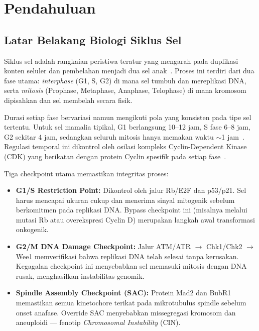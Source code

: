 \documentclass[conference]{IEEEtran}
\begin{document}
\section{Pendahuluan}

\subsection{Latar Belakang Biologi Siklus Sel}

Siklus sel adalah rangkaian peristiwa teratur yang mengarah pada duplikasi konten seluler dan pembelahan menjadi dua sel anak~\cite{alberts2022}. Proses ini terdiri dari dua fase utama: \textit{interphase} (G1, S, G2) di mana sel tumbuh dan mereplikasi DNA, serta \textit{mitosis} (Prophase, Metaphase, Anaphase, Telophase) di mana kromosom dipisahkan dan sel membelah secara fisik.

Durasi setiap fase bervariasi namun mengikuti pola yang konsisten pada tipe sel tertentu. Untuk sel mamalia tipikal, G1 berlangsung 10--12 jam, S fase 6--8 jam, G2 sekitar 4 jam, sedangkan seluruh mitosis hanya memakan waktu $\sim$1 jam~\cite{morgan2007}. Regulasi temporal ini dikontrol oleh osilasi kompleks Cyclin-Dependent Kinase (CDK) yang berikatan dengan protein Cyclin spesifik pada setiap fase~\cite{tyson2001}.

Tiga checkpoint utama memastikan integritas proses:
\begin{itemize}[noitemsep,topsep=3pt]
    \item \textbf{G1/S Restriction Point:} Dikontrol oleh jalur Rb/E2F dan p53/p21. Sel harus mencapai ukuran cukup dan menerima sinyal mitogenik sebelum berkomitmen pada replikasi DNA. Bypass checkpoint ini (misalnya melalui mutasi Rb atau overekspresi Cyclin D) merupakan langkah awal transformasi onkogenik.
    \item \textbf{G2/M DNA Damage Checkpoint:} Jalur ATM/ATR $\rightarrow$ Chk1/Chk2 $\rightarrow$ Wee1 memverifikasi bahwa replikasi DNA telah selesai tanpa kerusakan. Kegagalan checkpoint ini menyebabkan sel memasuki mitosis dengan DNA rusak, menghasilkan instabilitas genomik.
    \item \textbf{Spindle Assembly Checkpoint (SAC):} Protein Mad2 dan BubR1 memastikan semua kinetochore terikat pada mikrotubulus spindle sebelum onset anafase. Override SAC menyebabkan missegregasi kromosom dan aneuploidi --- fenotip \textit{Chromosomal Instability} (CIN).
\end{itemize}
\end{document}
